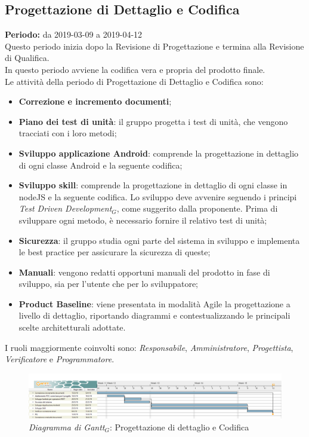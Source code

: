 \begin{flushleft}
\section{Progettazione di Dettaglio e Codifica}\label{PrDeC}
\textbf{Periodo:} da 2019-03-09 a 2019-04-12\\
Questo periodo inizia dopo la Revisione di Progettazione e termina  alla Revisione di Qualifica.\\
In questo periodo avviene la codifica vera e propria del prodotto finale.\\
Le attività della periodo di Progettazione di Dettaglio e Codifica sono:
\begin{itemize}
	\item \textbf{Correzione e incremento documenti}; 
	\item \textbf{Piano dei test di unità}: il gruppo progetta i test di unità, che vengono tracciati con i loro metodi; 
	\item \textbf{Sviluppo applicazione Android}: comprende la progettazione in dettaglio di ogni classe Android e la seguente codifica;
	\item \textbf{Sviluppo skill}: comprende la progettazione in dettaglio di ogni classe in nodeJS e la seguente codifica. Lo sviluppo deve avvenire seguendo i principi \textit{Test Driven Development$_{G}$}, come suggerito dalla proponente. Prima di sviluppare ogni metodo, è necessario fornire il relativo test di unità;
	\item \textbf{Sicurezza}: il gruppo studia ogni parte del sistema in sviluppo e implementa le best practice per assicurare la sicurezza di queste;
	\item \textbf{Manuali}: vengono redatti opportuni manuali del prodotto in fase di sviluppo, sia per l'utente che per lo sviluppatore;
	\item \textbf{Product Baseline}: viene presentata in modalità Agile la progettazione a livello di dettaglio, riportando diagrammi e contestualizzando le principali scelte architetturali adottate.
\end{itemize}
I ruoli maggiormente coinvolti sono: \textit{Responsabile}, \textit{Amministratore}, \textit{Progettista}, \textit{Verificatore} e \textit{Programmatore}.
\begin{figure} [h]
    \centering
    \includegraphics[scale=0.27]{./images/ZeroSevenGanttCodifica.png}
    \caption{\textit{Diagramma di Gantt$_{G}$}: Progettazione di dettaglio e Codifica }\label{G4}
\end{figure}


\end{flushleft}
